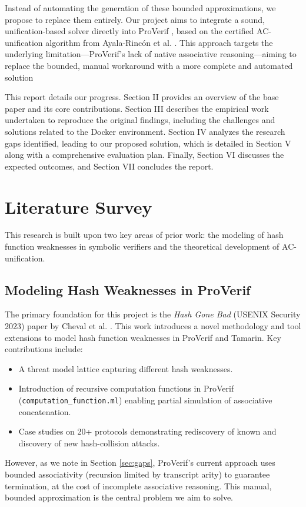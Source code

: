 \documentclass[journal]{IEEEtran}
\begin{document}
 Instead of automating the generation of these bounded approximations, we propose to replace them entirely. Our project aims to integrate a sound, unification-based solver directly into ProVerif , based on the certified AC-unification algorithm from Ayala-Rincón et al. \cite{ayala2024certified}. This approach targets the underlying limitation—ProVerif's lack of native associative reasoning—aiming to replace the bounded, manual workaround with a more complete and automated solution

This report details our progress. Section II provides an overview of the base paper \cite{cheval2023hash} and its core contributions. Section III describes the empirical work undertaken to reproduce the original findings, including the challenges and solutions related to the Docker environment. Section IV analyzes the research gaps identified, leading to our proposed solution, which is detailed in Section V along with a comprehensive evaluation plan. Finally, Section VI discusses the expected outcomes, and Section VII concludes the report.

\section{Literature Survey}
\label{sec:lit_survey}

This research is built upon two key areas of prior work: the modeling of hash function weaknesses in symbolic verifiers and the theoretical development of AC-unification.

\subsection{Modeling Hash Weaknesses in ProVerif}
The primary foundation for this project is the \textit{Hash Gone Bad} (USENIX Security 2023) paper by Cheval et al. \cite{cheval2023hash}. This work introduces a novel methodology and tool extensions to model hash function weaknesses in ProVerif and Tamarin. Key contributions include:
\begin{itemize}
    \item A threat model lattice capturing different hash weaknesses.
    \item Introduction of recursive computation functions in ProVerif (\texttt{computation\_function.ml}) enabling partial simulation of associative concatenation.
    \item Case studies on 20+ protocols demonstrating rediscovery of known and discovery of new hash-collision attacks.
\end{itemize}
However, as we note in Section \ref{sec:gaps}, ProVerif’s current approach uses bounded associativity (recursion limited by transcript arity) to guarantee termination, at the cost of incomplete associative reasoning. This manual, bounded approximation is the central problem we aim to solve.
\end{document}
